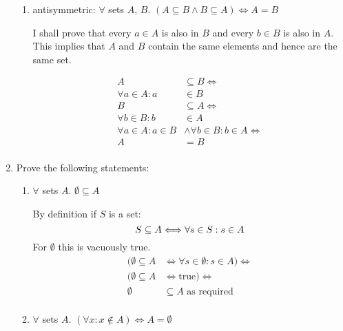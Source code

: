 \documentclass[10pt,\jkfside,a4paper]{article}
\begin{document}
\begin{enumerate}
\begin{enumerate}
\item antisymmetric: $\forall$ sets $A$, $B$. $(A \subseteq B \wedge B \subseteq A) \Longleftrightarrow A = B$

I shall prove that every $a \in A$ is also in $B$ and every $b \in B$ is also in $A$. This implies that $A$ and 
$B$ contain the same elements and hence are the same set.

\begin{equation}
\begin{split}
A &\subseteq B \Longleftrightarrow\\
\forall a \in A: a &\in B\\
B &\subseteq A \Longleftrightarrow\\
\forall b \in B: b &\in A\\
\forall a \in A: a \in B &\wedge \forall b \in B: b \in A \Longleftrightarrow\\
A &= B\\
\end{split}
\end{equation}

\end{enumerate}

\item Prove the following statements:

\begin{enumerate}

\item $\forall$ sets $A$. $\emptyset \subseteq A$

By definition if $S$ is a set:
\begin{equation}
S \subseteq A \Longleftrightarrow \forall s \in S: s \in A\\
\end{equation}
For $\emptyset$ this is vacuously true.
\begin{equation}
\begin{split}
(\emptyset \subseteq A &\Longleftrightarrow \forall s \in \emptyset: s \in A)\Longleftrightarrow\\
(\emptyset \subseteq A &\Longleftrightarrow \text{true})\Longleftrightarrow\\
\emptyset &\subseteq A\text{ as required}\\
\end{split}
\end{equation}

\item $\forall$ sets $A$. $(\forall x: x \notin A) \Longleftrightarrow A = \emptyset$


\end{enumerate}
\end{enumerate}
\end{document}
